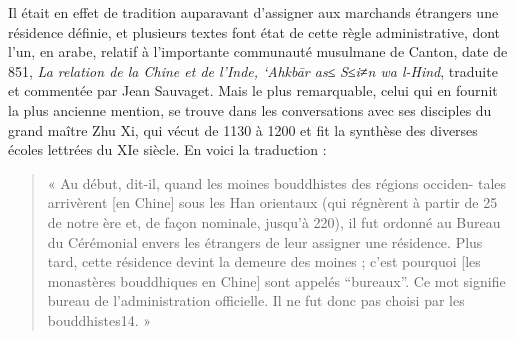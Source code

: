 Il était en effet de tradition auparavant d'assigner aux marchands étrangers une résidence définie, et plusieurs textes font état de
cette règle administrative, dont l'un, en arabe, relatif à
l'importante communauté musulmane de Canton, date de 851, \emph{La
relation de la Chine et de l'Inde, `Ahkbār as}≤
\emph{S}≤\emph{i}≠\emph{n wa l-Hind}, traduite et commentée par Jean
Sauvaget. Mais le plus remarquable, celui qui en fournit la plus
ancienne mention, se trouve dans les conversations avec ses disciples du
grand maître Zhu Xi, qui vécut de 1130 à 1200 et fit la synthèse des
diverses écoles lettrées du XIe siècle. En voici la traduction :
\begin{quote}
    « Au début, dit-il, quand les moines bouddhistes des régions occiden-
tales arrivèrent {[}en Chine{]} sous les Han orientaux (qui régnèrent
à partir de 25 de notre ère et, de façon nominale, jusqu'à 220), il fut
ordonné au Bureau du Cérémonial envers les étrangers de leur assigner
une résidence. Plus tard, cette résidence devint la demeure des moines ;
c'est pourquoi {[}les monastères bouddhiques en Chine{]} sont appelés
``bureaux''. Ce mot signifie bureau de l'administration officielle. Il
ne fut donc pas choisi par les bouddhistes14. »
\end{quote}


